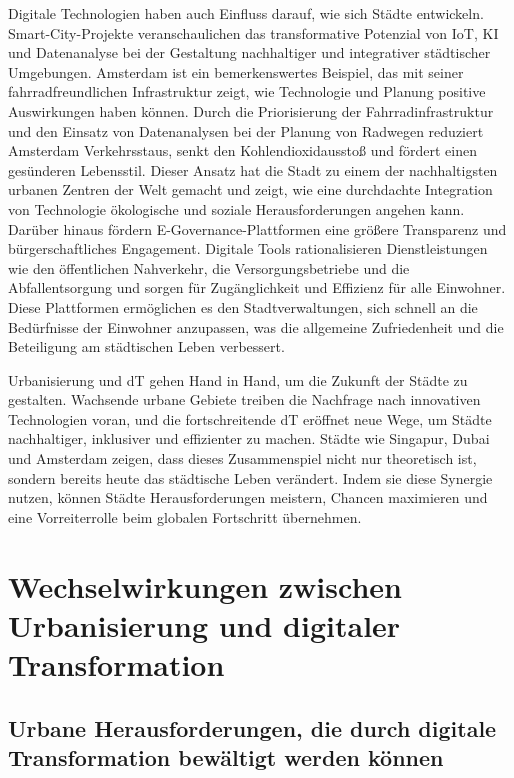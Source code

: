 \documentclass[conference,compsoc,final,a4paper, onecolumn, 11pt]{IEEEtran}
\begin{document}
Digitale Technologien haben auch Einfluss darauf, wie sich Städte entwickeln. 
Smart-City-Projekte veranschaulichen das transformative Potenzial von \ac{IoT}, \ac{KI} und Datenanalyse bei der Gestaltung nachhaltiger und integrativer städtischer Umgebungen. 
Amsterdam ist ein bemerkenswertes Beispiel, das mit seiner fahrradfreundlichen Infrastruktur zeigt, wie Technologie und Planung positive Auswirkungen haben können. 
Durch die Priorisierung der Fahrradinfrastruktur und den Einsatz von Datenanalysen bei der Planung von Radwegen reduziert Amsterdam Verkehrsstaus, senkt den Kohlendioxidausstoß und fördert einen gesünderen Lebensstil. 
Dieser Ansatz hat die Stadt zu einem der nachhaltigsten urbanen Zentren der Welt gemacht und zeigt, wie eine durchdachte Integration von Technologie ökologische und soziale Herausforderungen angehen kann. \autocite{buehler_cycling_2010}
Darüber hinaus fördern E-Governance-Plattformen eine größere Transparenz und bürgerschaftliches Engagement. 
Digitale Tools rationalisieren Dienstleistungen wie den öffentlichen Nahverkehr, die Versorgungsbetriebe und die Abfallentsorgung und sorgen für Zugänglichkeit und Effizienz für alle Einwohner. 
Diese Plattformen ermöglichen es den Stadtverwaltungen, sich schnell an die Bedürfnisse der Einwohner anzupassen, was die allgemeine Zufriedenheit und die Beteiligung am städtischen Leben verbessert.

Urbanisierung und \ac{dT} gehen Hand in Hand, um die Zukunft der Städte zu gestalten. 
Wachsende urbane Gebiete treiben die Nachfrage nach innovativen Technologien voran, und die fortschreitende \ac{dT} eröffnet neue Wege, um Städte nachhaltiger, inklusiver und effizienter zu machen. 
Städte wie Singapur, Dubai und Amsterdam zeigen, dass dieses Zusammenspiel nicht nur theoretisch ist, sondern bereits heute das städtische Leben verändert. 
Indem sie diese Synergie nutzen, können Städte Herausforderungen meistern, Chancen maximieren und eine Vorreiterrolle beim globalen Fortschritt übernehmen.


\section{Wechselwirkungen zwischen Urbanisierung und digitaler Transformation}
\subsection{Urbane Herausforderungen, die durch digitale Transformation bewältigt werden können}
\end{document}
